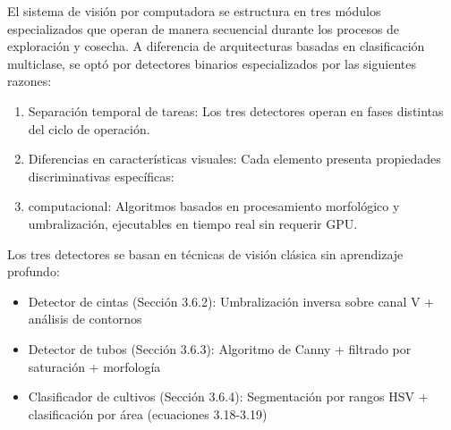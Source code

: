 El sistema de visión por computadora se estructura en tres módulos especializados que operan de manera secuencial durante los procesos de exploración y cosecha. A diferencia de arquitecturas basadas en clasificación multiclase, se optó por detectores binarios especializados por las siguientes razones:
\begin{enumerate}
\item Separación temporal de tareas: Los tres detectores operan en fases distintas del ciclo de operación.

\item Diferencias en características visuales: Cada elemento presenta propiedades discriminativas específicas:

\item computacional: Algoritmos basados en procesamiento morfológico y umbralización, ejecutables en tiempo real sin requerir GPU.
\end{enumerate}
Los tres detectores se basan en técnicas de visión clásica sin aprendizaje profundo:
\begin{itemize}[label=$\bullet$]
    \item Detector de cintas (Sección 3.6.2): Umbralización inversa sobre canal V + análisis de contornos
    \item Detector de tubos (Sección 3.6.3): Algoritmo de Canny + filtrado por saturación + morfología
    \item Clasificador de cultivos (Sección 3.6.4): Segmentación por rangos HSV + clasificación por área (ecuaciones 3.18-3.19)
\end{itemize}


